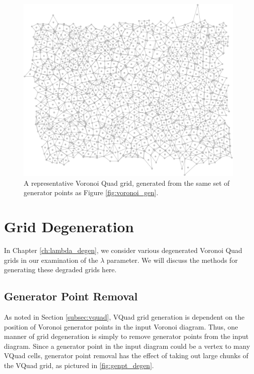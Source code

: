 \documentclass[a4paper,11pt]{report}
\begin{document}
\begin{figure}[htp]
\centering
\includegraphics[width=1.0\textwidth]{ch3_figs/vquad_stoma_v2}
\caption[Voronoi Quad Grid]{
  A representative Voronoi Quad grid, generated from the same set of generator points as Figure 
  \ref{fig:voronoi_gen}.
}
\label{fig:vquad_grid}
\end{figure}

\section{Grid Degeneration}

In Chapter \ref{ch:lambda_degen}, we consider various degenerated Voronoi Quad grids
in our examination of the $\lambda$ parameter. We will discuss the methods for generating these degraded grids here.

\subsection{Generator Point Removal}
\label{subsec:gen_pt_rem}
As noted in Section \ref{subsec:vquad}, VQuad grid generation is dependent on the position of Voronoi generator points in the input Voronoi diagram. Thus, one manner of grid degeneration is simply to remove generator points from the input diagram. Since a generator point in the input diagram could be a vertex to many VQuad cells, generator point removal has the effect of taking out large chunks of the VQuad grid, as pictured in \ref{fig:genpt_degen}.
\end{document}
